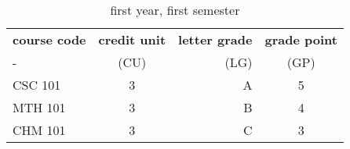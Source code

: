 \documentclass{article}
\begin{document}
	
	\begin{table}[h!]
		\begin{center}
			\caption{first year, first semester}
			\label{tab:table1}
			\begin{tabular}{l|c|r|c}
				\textbf{course code} & \textbf{credit unit} & \textbf{letter grade} & \textbf{grade point}\\
				- & (CU) & (LG) & (GP)\\
				\hline
				CSC 101 & 3 & A & 5\\
				MTH 101 & 3 & B & 4\\
				CHM 101 & 3 & C & 3\\
				\end{tabular}
		\end{center}
	\end{table}
\end{document}
